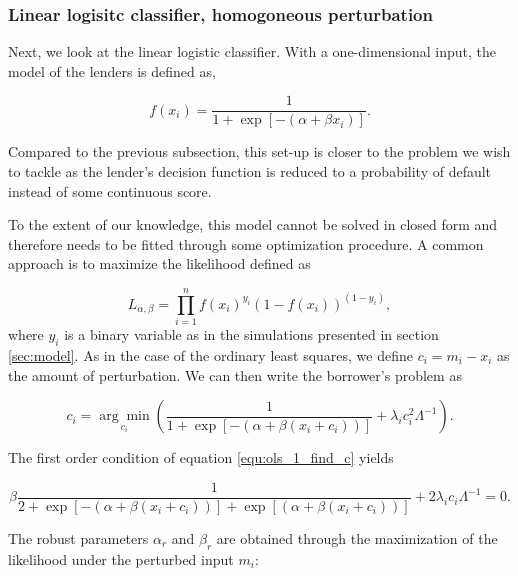 \documentclass[12pt]{article} %
\begin{document}
\subsubsection{Linear logisitc classifier, homogoneous perturbation}
Next, we look at the linear logistic classifier. With a one-dimensional input, the model of the lenders is defined as,

\begin{equation}\label{equ:logit_1D_function}
f(x_i) = \frac{1}{1+\exp{ \left[ -(\alpha + \beta x_i) \right ] }}.
\end{equation}

Compared to the previous subsection, this set-up is closer to the problem we wish to tackle as the lender's decision function is reduced to a probability of default instead of some continuous score. 

To the extent of our knowledge, this model cannot be solved in closed form and therefore needs to be fitted through some optimization procedure. A common approach is to maximize the likelihood defined as 

\begin{equation} \label{equ:proof_1d_logit_likelihood}
L_{\alpha, \beta} = 
\prod_{i=1}^n f\left(x_{i}\right)^{y_{i}}\left(1-f\left(x_{i}\right)\right)^{\left(1-y_{i}\right)},
\end{equation}
where $y_i$ is a binary variable as in the simulations presented in section \ref{sec:model}.  As in the case of the ordinary least squares, we define $c_i=m_i-x_i$ as the amount of perturbation. We can then write the borrower's problem as

\begin{equation}\label{equ:ols_1_find_c}
c_i = \underset{c_i}{\arg \min } \left( \frac{1}{1+\exp{ \left[ -(\alpha + \beta (x_i+c_i)) \right ] }} +\lambda_i c_i^2 \Lambda^{-1} \right).
\end{equation}

The first order condition of equation \eqref{equ:ols_1_find_c} yields

\begin{equation} \label{equ:proof_1d_borrower_foc}
\beta \frac{1}{2+\exp{ \left[ -(\alpha + \beta (x_i+c_i)) \right ] } +\exp{ \left[ (\alpha + \beta (x_i+c_i)) \right ] } }  + 2 \lambda_i c_i \Lambda ^{-1} = 0.
\end{equation}

The robust parameters $\alpha_r$ and $\beta_r$ are obtained through the maximization of the likelihood under the perturbed input $m_i$: 
\end{document}
